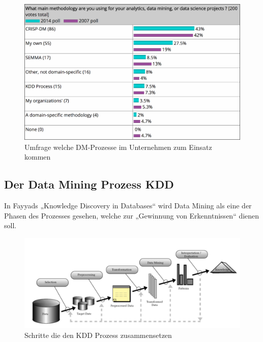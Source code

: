 \begin{figure}[htb]
	\includegraphics[width=\textwidth]{gfx/dmprocesses.png}
	\caption{Umfrage welche DM-Prozesse im Unternehmen zum Einsatz kommen \cite{KDN}}
	\label{fig:process:alt:cor}
\end{figure}

\subsection{Der Data Mining Prozess KDD}
\label{sec:process:alt:kdd}

In Fayyads „Knowledge Discovery in Databases“ \cite{FAY:96} wird Data Mining als
eine der Phasen des  Prozesses gesehen, welche zur „Gewinnung von Erkenntnissen“
dienen soll.

\begin{figure}[htb]
	\includegraphics[width=\textwidth]{gfx/kdd.png}
	\caption{Schritte die den KDD Prozess zusammensetzen \cite{FAY:96}}
	\label{fig:process:alt:kdd}
\end{figure}

